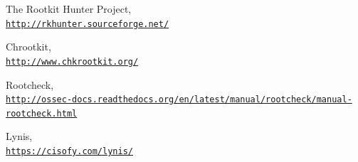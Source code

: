 \documentclass[12pt]{article}
\begin{document}
\begin{thebibliography}{9}
The Rootkit Hunter Project,
\\\href{http://rkhunter.sourceforge.net/}{\texttt{http://rkhunter.sourceforge.net/}}

Chrootkit,
\\\href{http://www.chkrootkit.org/}{\texttt{http://www.chkrootkit.org/}}

Rootcheck,
\\\href{http://ossec-docs.readthedocs.org/en/latest/manual/rootcheck/manual-rootcheck.html}{\texttt{http://ossec-docs.readthedocs.org/en/latest/manual/rootcheck/manual-rootcheck.html}}

Lynis,
\\\href{https://cisofy.com/lynis/}{\texttt{https://cisofy.com/lynis/}}

\end{thebibliography}
\end{document}

